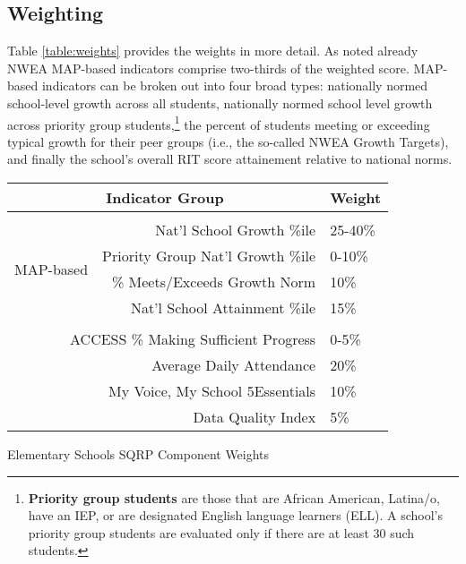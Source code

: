 \documentclass[sfsidenotes, justified]{tufte-handout}\usepackage[]{graphicx}\usepackage[]{color}
\begin{document}
\subsection{Weighting}

Table \ref{table:weights} provides the weights in more detail.  As noted already NWEA MAP-based indicators comprise two-thirds of the weighted score.  MAP-based indicators can be broken out into four broad types: nationally normed school-level growth across all students, nationally normed school level growth across priority group students,\footnote{\textbf{Priority group students} are those that are African American, Latina/o, have an IEP, or are designated English language learners (ELL). A school's priority group students are evaluated only if there are at least 30 such students.} the percent of students meeting or exceeding typical growth for their peer groups (i.e., the so-called NWEA Growth Targets), and finally the school's overall RIT score attainement relative to national norms. 

\begin{margintable}\scriptsize  
  \begin{tabular}{|l|r|l|}
    \hline
    \multicolumn{2}{|c|}{\textbf{Indicator Group}} &  \textbf{Weight} \\
    \hline
     & & \\
    \multirow{4}{*}{MAP-based} & {Nat'l School Growth \%ile} & 25-40\% \\
     & Priority Group Nat'l Growth \%ile                    & 0-10\%  \\
     & \% Meets/Exceeds Growth Norm                      & 10\%    \\
     & Nat'l School Attainment \%ile                          & 15\%    \\
     & & \\
    \hline
    \multicolumn{2}{|r|}{ACCESS \% Making Sufficient Progress} & 0-5\%   \\ 
    \multicolumn{2}{|r|}{Average Daily Attendance}              & 20\%    \\
    \multicolumn{2}{|r|}{My Voice, My School 5Essentials}       & 10\%    \\
    \multicolumn{2}{|r|}{Data Quality Index}                    & 5\%    \\
    \hline
  \end{tabular}
  \caption{Elementary Schools SQRP Component Weights}
  \label{table:weights}
\end{margintable}
\end{document}
